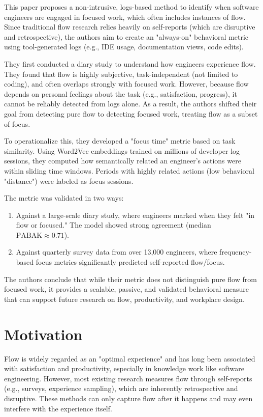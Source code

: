 This paper proposes a non-intrusive, logs-based method to identify when software engineers are engaged in focused work, which often includes instances of flow. Since traditional flow research relies heavily on self-reports (which are disruptive and retrospective), the authors aim to create an "always-on" behavioral metric using tool-generated logs (e.g., IDE usage, documentation views, code edits).

They first conducted a diary study to understand how engineers experience flow. They found that flow is highly subjective, task-independent (not limited to coding), and often overlaps strongly with focused work. However, because flow depends on personal feelings about the task (e.g., satisfaction, progress), it cannot be reliably detected from logs alone. As a result, the authors shifted their goal from detecting pure flow to detecting focused work, treating flow as a subset of focus.

To operationalize this, they developed a "focus time" metric based on task similarity. Using Word2Vec embeddings trained on millions of developer log sessions, they computed how semantically related an engineer’s actions were within sliding time windows. Periods with highly related actions (low behavioral "distance") were labeled as focus sessions.

The metric was validated in two ways:
\begin{enumerate}
    \item Against a large-scale diary study, where engineers marked when they felt "in flow or focused." The model showed strong agreement (median $\text{PABAK} \approx 0.71$).
    \item Against quarterly survey data from over 13,000 engineers, where frequency-based focus metrics significantly predicted self-reported flow/focus.
\end{enumerate}
The authors conclude that while their metric does not distinguish pure flow from focused work, it provides a scalable, passive, and validated behavioral measure that can support future research on flow, productivity, and workplace design.

\section{Motivation}
Flow is widely regarded as an "optimal experience" and has long been associated with satisfaction and productivity, especially in knowledge work like software engineering. However, most existing research measures flow through self-reports (e.g., surveys, experience sampling), which are inherently retrospective and disruptive. These methods can only capture flow after it happens and may even interfere with the experience itself.


